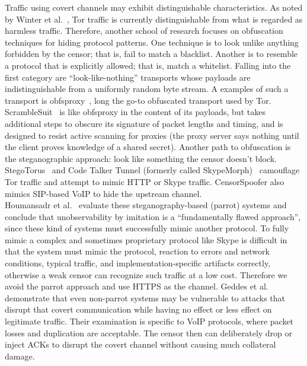 \documentclass{article}
\begin{document}
Traffic using covert channels may exhibit distinguishable characteristics. As
noted by Winter et al.~\cite{foci12-winter}, Tor traffic is currently
distinguishable from what is regarded as harmless traffic. Therefore, another school of research focuses on obfuscation
techniques for hiding protocol patterns. One technique is to look unlike
anything forbidden by the censor; that is, fail to match a blacklist. Another is
to resemble a protocol that is explicitly allowed; that is, match a whitelist.
Falling into the first category are ``look-like-nothing'' transports whose
payloads are indistinguishable from a uniformly random byte stream. A examples
of such a transport is obfsproxy~\cite{obfsproxy}, long the go-to obfuscated
transport used by Tor. ScrambleSuit~\cite{scramblesuit} is like obfsproxy in the
content of its payloads, but takes additional steps to obscure its signature of
packet lengths and timing, and is designed to resist active scanning for proxies
(the proxy server says nothing until the client proves knowledge of a shared
secret). Another path to obfuscation is the steganographic approach: look like
something the censor doesn't block. StegoTorus~\cite{stegotorus} and Code Talker
Tunnel (formerly called SkypeMorph)~\cite{skypemorph} camouflage Tor traffic and
attempt to mimic HTTP or Skype traffic. CensorSpoofer also mimics SIP-based VoIP
to hide the upstream channel.\\

Houmansadr et al.~\cite{parrot} evaluate these steganography-based (parrot)
systems and conclude that unobservability by imitation is a ``fundamentally
flawed approach'', since these kind of systems must successfully mimic another
protocol. To fully mimic a complex and sometimes proprietary protocol like Skype
is difficult in that the system must mimic the protocol,  reaction to errors and
network conditions, typical traffic, and implementation-specific artifacts
correctly, otherwise a weak censor can recognize such traffic at a low cost.
Therefore we avoid the parrot approach and use HTTPS as the channel. Geddes et
al.~\cite{acks} demonstrate that even non-parrot systems may be vulnerable to
attacks that disrupt that covert communication while having no effect or less
effect on legitimate traffic. Their examination is specific to VoIP protocols,
where packet losses and duplication are acceptable. The censor then can
deliberately drop or inject ACKs to disrupt the covert channel without causing
much collateral damage.\\
\end{document}
